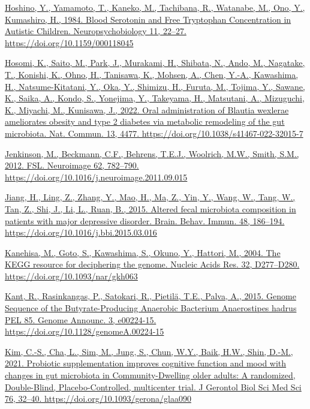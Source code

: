 \documentclass[
]{article}
\begin{document}
\href{https://www.zotero.org/google-docs/?uydJ8e}{Hoshino, Y., Yamamoto,
T., Kaneko, M., Tachibana, R., Watanabe, M., Ono, Y., Kumashiro, H.,
1984. Blood Serotonin and Free Tryptophan Concentration in Autistic
Children. Neuropsychobiology 11, 22--27.
https://doi.org/10.1159/000118045}

\href{https://www.zotero.org/google-docs/?uydJ8e}{Hosomi, K., Saito, M.,
Park, J., Murakami, H., Shibata, N., Ando, M., Nagatake, T., Konishi,
K., Ohno, H., Tanisawa, K., Mohsen, A., Chen, Y.-A., Kawashima, H.,
Natsume-Kitatani, Y., Oka, Y., Shimizu, H., Furuta, M., Tojima, Y.,
Sawane, K., Saika, A., Kondo, S., Yonejima, Y., Takeyama, H., Matsutani,
A., Mizuguchi, K., Miyachi, M., Kunisawa, J., 2022. Oral administration
of Blautia wexlerae ameliorates obesity and type 2 diabetes via
metabolic remodeling of the gut microbiota. Nat. Commun. 13, 4477.
https://doi.org/10.1038/s41467-022-32015-7}

\href{https://www.zotero.org/google-docs/?uydJ8e}{Jenkinson, M.,
Beckmann, C.F., Behrens, T.E.J., Woolrich, M.W., Smith, S.M., 2012. FSL.
Neuroimage 62, 782--790.
https://doi.org/10.1016/j.neuroimage.2011.09.015}

\href{https://www.zotero.org/google-docs/?uydJ8e}{Jiang, H., Ling, Z.,
Zhang, Y., Mao, H., Ma, Z., Yin, Y., Wang, W., Tang, W., Tan, Z., Shi,
J., Li, L., Ruan, B., 2015. Altered fecal microbiota composition in
patients with major depressive disorder. Brain. Behav. Immun. 48,
186--194. https://doi.org/10.1016/j.bbi.2015.03.016}

\href{https://www.zotero.org/google-docs/?uydJ8e}{Kanehisa, M., Goto,
S., Kawashima, S., Okuno, Y., Hattori, M., 2004. The KEGG resource for
deciphering the genome. Nucleic Acids Res. 32, D277--D280.
https://doi.org/10.1093/nar/gkh063}

\href{https://www.zotero.org/google-docs/?uydJ8e}{Kant, R., Rasinkangas,
P., Satokari, R., Pietilä, T.E., Palva, A., 2015. Genome Sequence of the
Butyrate-Producing Anaerobic Bacterium Anaerostipes hadrus PEL 85.
Genome Announc. 3, e00224-15. https://doi.org/10.1128/genomeA.00224-15}

\href{https://www.zotero.org/google-docs/?uydJ8e}{Kim, C.-S., Cha, L.,
Sim, M., Jung, S., Chun, W.Y., Baik, H.W., Shin, D.-M., 2021. Probiotic
supplementation improves cognitive function and mood with changes in gut
microbiota in Community-Dwelling older adults: A randomized,
Double-Blind, Placebo-Controlled, multicenter trial. J Gerontol Biol Sci
Med Sci 76, 32--40. https://doi.org/10.1093/gerona/glaa090}
\end{document}
